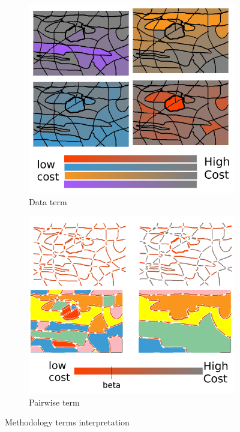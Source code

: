 \begin{figure}
\begin{subfigure}[b]{0.39\textwidth}
        \includegraphics[width=\textwidth]{data}
        \caption[]%
        {{\small Data term}}    
        \label{fig:methodTerms:data}
    \end{subfigure}
    \hfill
    \begin{subfigure}[b]{0.39\textwidth}   
        \centering 
        \includegraphics[width=\textwidth]{smooth} \caption[]%
        {{\small Pairwise term }}
        \label{fig:methodTerms:boundary}
    \end{subfigure}
    \caption {\small Methodology terms interpretation} 
    \label{fig:methodterms}
\end{figure}

